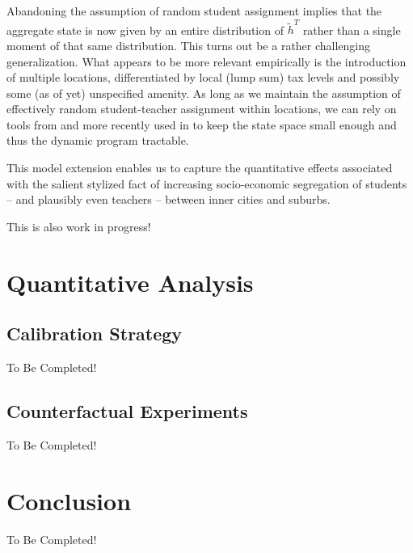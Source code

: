 \documentclass[onehalfspacing,11pt]{article}
\begin{document}
Abandoning the assumption of random student assignment implies that the aggregate state is now given by an entire distribution of $\widetilde{h}^{T}$ rather than a single moment of that same distribution. This turns out be a rather challenging generalization. What appears to be more relevant empirically is the introduction of multiple locations, differentiated by local (lump sum) tax levels and possibly some (as of yet) unspecified amenity. As long as we maintain the assumption of effectively random student-teacher assignment within locations, we can rely on tools from \cite{Lucas:2014} and more recently used in \cite{Martellini:2019} to keep the state space small enough and thus the dynamic program tractable.

This model extension enables us to capture the quantitative effects associated with the salient stylized fact of increasing socio-economic segregation of students -- and plausibly even teachers -- between inner cities and suburbs.

{\sc This is also work in progress!}
\section{Quantitative Analysis}\label{sec:quant}
\subsection{Calibration Strategy}
{\sc To Be Completed!}
\subsection{Counterfactual Experiments}
{\sc To Be Completed!}
\section{Conclusion}\label{sec:conclusion}
{\sc To Be Completed!}
\newpage


\end{document}
